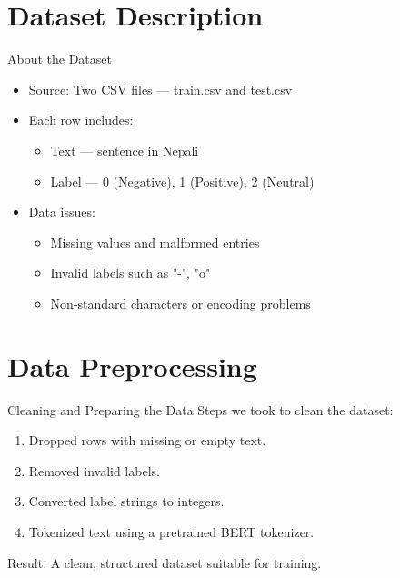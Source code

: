 \documentclass[aspectratio=169]{beamer}
\begin{document}
\section{Dataset Description}
\begin{frame}{About the Dataset}
  \begin{itemize}
    \item Source: Two CSV files — train.csv and test.csv
    \item Each row includes:
    \begin{itemize}
      \item Text — sentence in Nepali
      \item Label — 0 (Negative), 1 (Positive), 2 (Neutral)
    \end{itemize}
    \item Data issues:
    \begin{itemize}
      \item Missing values and malformed entries
      \item Invalid labels such as "-", "o"
      \item Non-standard characters or encoding problems
    \end{itemize}
  \end{itemize}
\end{frame}

\section{Data Preprocessing}
\begin{frame}{Cleaning and Preparing the Data}
  Steps we took to clean the dataset:
  \begin{enumerate}
    \item Dropped rows with missing or empty text.
    \item Removed invalid labels.
    \item Converted label strings to integers.
    \item Tokenized text using a pretrained BERT tokenizer.
  \end{enumerate}
  Result: A clean, structured dataset suitable for training.
\end{frame}

\end{document}
